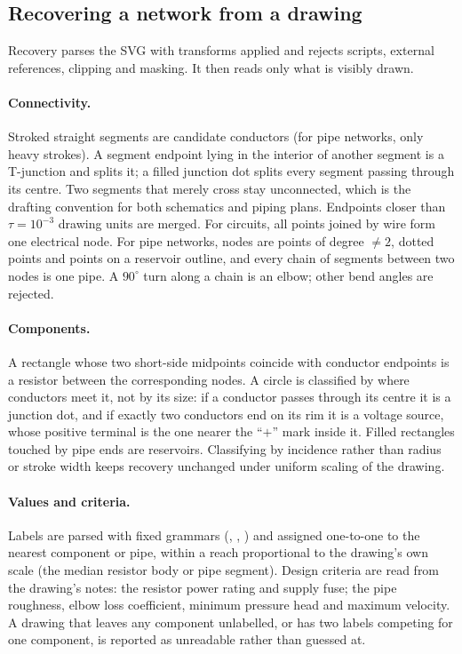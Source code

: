 \subsection{Recovering a network from a drawing}
Recovery parses the SVG with transforms applied and rejects scripts, external references, clipping and
masking. It then reads only what is visibly drawn.

\paragraph{Connectivity.} Stroked straight segments are candidate conductors (for pipe networks, only heavy
strokes). A segment endpoint lying in the interior of another segment is a T-junction and splits it; a filled
junction dot splits every segment passing through its centre. Two segments that merely cross stay
unconnected, which is the drafting convention for both schematics and piping plans. Endpoints closer than
$\tau = 10^{-3}$ drawing units are merged. For circuits, all points joined by wire form one electrical node.
For pipe networks, nodes are points of degree $\neq 2$, dotted points and points on a reservoir outline, and
every chain of segments between two nodes is one pipe. A $90^\circ$ turn along a chain is an elbow; other
bend angles are rejected.

\paragraph{Components.} A rectangle whose two short-side midpoints coincide with conductor endpoints is a
resistor between the corresponding nodes. A circle is classified by where conductors meet it, not by its size:
if a conductor passes through its centre it is a junction dot, and if exactly two conductors end on its rim it
is a voltage source, whose positive terminal is the one nearer the ``$+$'' mark inside it. Filled rectangles
touched by pipe ends are reservoirs. Classifying by incidence rather than radius or stroke width keeps recovery
unchanged under uniform scaling of the drawing.

\paragraph{Values and criteria.} Labels are parsed with fixed grammars (\eg {},
, ) and assigned one-to-one to the nearest component or pipe,
within a reach proportional to the drawing's own scale (the median resistor body or pipe segment). Design
criteria are read from the drawing's notes: the resistor power rating and supply fuse; the pipe roughness,
elbow loss coefficient, minimum pressure head and maximum velocity. A drawing that leaves any component
unlabelled, or has two labels competing for one component, is reported as unreadable rather than guessed at.

